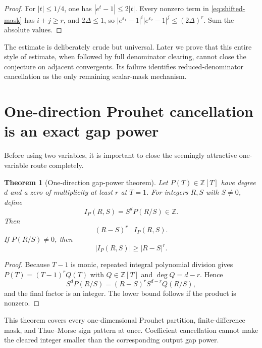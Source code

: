 \documentclass[11pt,oneside]{article}
\newtheorem{theorem}{Theorem}[section]
\theoremstyle{definition}
\theoremstyle{remark}
\newcommand{\Z}{\mathbb Z}
\begin{document}
\begin{proof}
For $|t|\le1/4$, one has $|e^t-1|\le2|t|$.  Every nonzero term in
\eqref{eq:shifted-mask} has $i+j\ge r$, and $2\Delta\le1$, so
$|e^{\varepsilon_1}-1|^i|e^{\varepsilon_2}-1|^j\le(2\Delta)^r$.
Sum the absolute values.
\end{proof}

The estimate is deliberately crude but universal.  Later we prove that this entire style of
estimate, when followed by full denominator clearing, cannot close the conjecture on
adjacent convergents.  Its failure identifies reduced-denominator cancellation as the only
remaining scalar-mask mechanism.

\section{One-direction Prouhet cancellation is an exact gap power}
\label{sec:one-direction}

Before using two variables, it is important to close the seemingly attractive one-variable
route completely.

\begin{theorem}[One-direction gap-power theorem]
\label{thm:univariate-gap-power}
Let $P(T)\in\Z[T]$ have degree $d$ and a zero of multiplicity at least $r$ at $T=1$.
For integers $R,S$ with $S\ne0$, define
\begin{equation}
 I_P(R,S)=S^dP(R/S)\in\Z.
 \label{eq:univariate-cleared}
\end{equation}
Then
\begin{equation}
 (R-S)^r\mid I_P(R,S).
 \label{eq:gap-power-divides}
\end{equation}
If $P(R/S)\ne0$, then
\begin{equation}
 |I_P(R,S)|\ge |R-S|^r.
 \label{eq:gap-power-floor}
\end{equation}
\end{theorem}

\begin{proof}
Because $T-1$ is monic, repeated integral polynomial division gives
$P(T)=(T-1)^rQ(T)$ with $Q\in\Z[T]$ and $\deg Q=d-r$.  Hence
\[
 S^dP(R/S)
 =(R-S)^r S^{d-r}Q(R/S),
\]
and the final factor is an integer.  The lower bound follows if the product is nonzero.
\end{proof}

This theorem covers every one-dimensional Prouhet partition, finite-difference mask, and
Thue--Morse sign pattern at once.  Coefficient cancellation cannot make the cleared integer
smaller than the corresponding output gap power.
\end{document}
